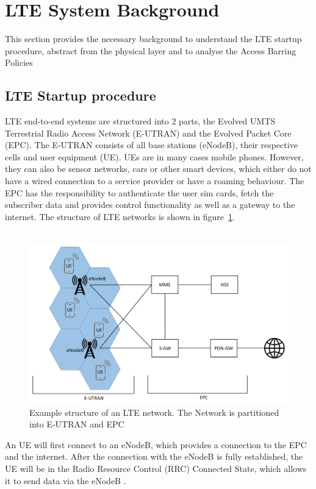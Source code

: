 \documentclass[conference]{IEEEtran}
\begin{document}
\section{LTE System Background}
This section provides the necessary background to understand the LTE startup procedure, abstract from the physical layer and to analyse the Access Barring Policies
\subsection{LTE Startup procedure}
LTE end-to-end systems are structured into 2 parts, the Evolved UMTS Terrestrial Radio Access Network (E-UTRAN) and the Evolved Packet Core (EPC).
The E-UTRAN consists of all base stations (eNodeB), their respective cells and user equipment (UE).
UEs are in many cases mobile phones.
However, they can also be sensor networks, cars or other smart devices, which either do not have a wired connection to a service provider or have a roaming behaviour.
The EPC has the responsibility to authenticate the user sim cards, fetch the subscriber data and provides control functionality as well as a gateway to the internet.
The structure of LTE networks is shown in figure~\ref{fig:LTE_Network}.\\\\
\begin{figure}
    \centering
    \includegraphics[width= \columnwidth]{../Figures/LTE_Netzwerk}
    \caption{Example structure of an LTE network. The Network is partitioned into E-UTRAN and EPC}
    \label{fig:LTE_Network}
\end{figure}
An UE will first connect to an eNodeB, which provides a connection to the EPC and the internet.
After the connection with the eNodeB is fully established, the UE will be in the Radio Resource Control (RRC) Connected State, which allows it to send data via the eNodeB .
\end{document}
